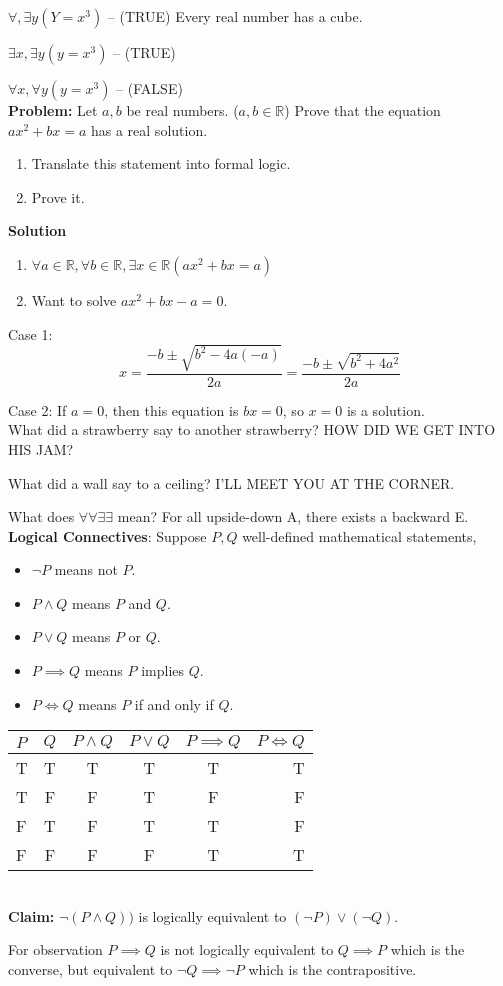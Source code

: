 \documentclass[a4paper, 11pt, twoside]{article}
\begin{document}
$\forall, \exists y (Y=x^3)$ -- (TRUE) Every real number has a cube.

$\exists x, \exists y (y=x^3)$ -- (TRUE)

$\forall x, \forall y (y=x^3)$ -- (FALSE)
\\

\textbf{Problem:} Let $a, b$ be real numbers. ($a, b \in \mathbb{R}$) Prove that the equation $ax^2 + bx = a$ has a real solution.

\begin{enumerate}
	\item Translate this statement into formal logic.
	\item Prove it.
\end{enumerate}

\textbf{Solution}
\\
\begin{enumerate}
	\item $\forall a\in \mathbb{R}, \forall b\in \mathbb{R}, \exists x\in \mathbb{R} (ax^2+bx=a)$
	\item Want to solve $ax^2+bx-a=0$.
\end{enumerate}


Case 1:
\[
	x = \frac{-b\pm \sqrt{b^2-4a(-a)}}{2a} = \frac{-b\pm\sqrt{b^2+4a^2}}{2a}
\]

Case 2: If $a=0$, then this equation is $bx=0$, so $x=0$ is a solution.
\\

What did a strawberry say to another strawberry? HOW DID WE GET INTO HIS JAM?

What did a wall say to a ceiling? I'LL MEET YOU AT THE CORNER.

What does $\forall\forall\exists\exists$ mean? For all upside-down A, there exists a backward E.
\\

\textbf{Logical Connectives}: Suppose $P, Q$ well-defined mathematical statements, 

\begin{itemize}
	\item $\neg P$ means not $P$.
	\item $P \wedge Q$ means $P$ and $Q$.
	\item $P \vee Q$ means $P$ or $Q$.
	\item $P\implies Q$ means $P$ implies $Q$.
	\item $P \iff Q$ means $P$ if and only if $Q$.
\end{itemize}

\begin{tabular}{|l|c|c|c|c|r|}
	\hline
	$P$ & $Q$ & $P\wedge Q$ & $P\vee Q$ & $P\implies Q$ & $P\iff Q$ \\
	\hline
	T & T & T & T & T & T \\
	\hline
	T & F & F & T & F & F \\
	\hline
	F & T & F & T & T & F \\
	\hline
	F & F & F & F & T & T \\
	\hline
\end{tabular}
\\

\textbf{Claim:} $\neg (P \wedge Q))$ is logically equivalent to $(\neg P)\vee (\neg Q)$.

For observation $P\implies Q$ is not logically equivalent to $Q \implies P$ which is the converse, but equivalent to $\neg Q \implies \neg P$ which is the contrapositive.
\end{document}
